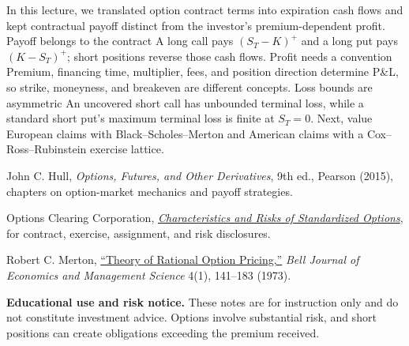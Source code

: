 \documentclass[11pt]{article}
\begin{document}
\keytakeaways
  {In this lecture, we translated option contract terms into expiration cash flows and kept contractual payoff distinct from the investor's premium-dependent profit.}
  {Payoff belongs to the contract}
  {A long call pays $(S_T-K)^+$ and a long put pays $(K-S_T)^+$; short positions reverse those cash flows.}
  {Profit needs a convention}
  {Premium, financing time, multiplier, fees, and position direction determine P\&L, so strike, moneyness, and breakeven are different concepts.}
  {Loss bounds are asymmetric}
  {An uncovered short call has unbounded terminal loss, while a standard short put's maximum terminal loss is finite at $S_T=0$.}
  {Next, value European claims with Black--Scholes--Merton and American claims with a Cox--Ross--Rubinstein exercise lattice.}

\begin{readinglist}
  \item John C. Hull, \emph{Options, Futures, and Other Derivatives}, 9th ed., Pearson (2015), chapters on option-market mechanics and payoff strategies.
  \item Options Clearing Corporation, \href{https://www.theocc.com/company-information/documents-and-archives/options-disclosure-document}{\emph{Characteristics and Risks of Standardized Options}}, for contract, exercise, assignment, and risk disclosures.
  \item Robert C. Merton, \href{https://doi.org/10.2307/1831029}{``Theory of Rational Option Pricing,''} \emph{Bell Journal of Economics and Management Science} 4(1), 141--183 (1973).
\end{readinglist}

\vfill
{\sffamily\footnotesize\color{vnmuted}\textbf{Educational use and risk notice.} These notes are for instruction only and do not constitute investment advice. Options involve substantial risk, and short positions can create obligations exceeding the premium received.}
\end{document}
